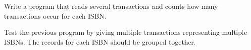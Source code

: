 %
%
\begin{question}
Write a program that reads several transactions and counts
how many transactions occur for each ISBN.
\end{question}

\begin{question}
Test the previous program by giving multiple transactions
representing multiple ISBNs. The records for each ISBN should be grouped
together.
\end{question}
